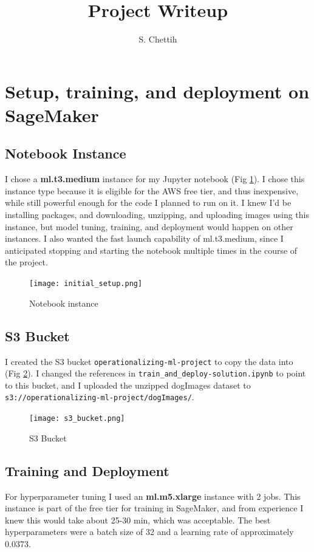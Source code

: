 \documentclass[11pt]{amsart}
\title{Project Writeup}
\author{S. Chettih}
\begin{document}
\maketitle
\section{Setup, training, and deployment on SageMaker}
\subsection{Notebook Instance}
I chose a \textbf{ml.t3.medium} instance for my Jupyter notebook (Fig \ref{fig:init}). I chose this instance type because it is eligible for the AWS free tier, and thus inexpensive, while still powerful enough for the code I planned to run on it. I knew I'd be installing packages, and downloading, unzipping, and uploading images using this instance, but model tuning, training, and deployment would happen on other instances. I also wanted the fast launch capability of ml.t3.medium, since I anticipated stopping and starting the notebook multiple times in the course of the project.
\begin{figure}[h]
\texttt{[image: initial\_setup.png]}
\caption{Notebook instance}
\label{fig:init}
\end{figure}
\subsection{S3 Bucket}
I created the S3 bucket \texttt{operationalizing-ml-project} to copy the data into (Fig \ref{fig:bucket}). I changed the references in \verb^train_and_deploy-solution.ipynb^ to point to this bucket, and I uploaded the unzipped dogImages dataset to \newline
 \verb^s3://operationalizing-ml-project/dogImages/^.
\begin{figure}[h]
\texttt{[image: s3\_bucket.png]}
\caption{S3 Bucket}
\label{fig:bucket}
\end{figure}
\subsection{Training and Deployment}
For hyperparameter tuning I used an \textbf{ml.m5.xlarge} instance with 2 jobs. This instance is part of the free tier for training in SageMaker, and from experience I knew this would take about 25-30 min, which was acceptable. The best hyperparameters were a batch size of 32 and a learning rate of approximately 0.0373.
\end{document}
